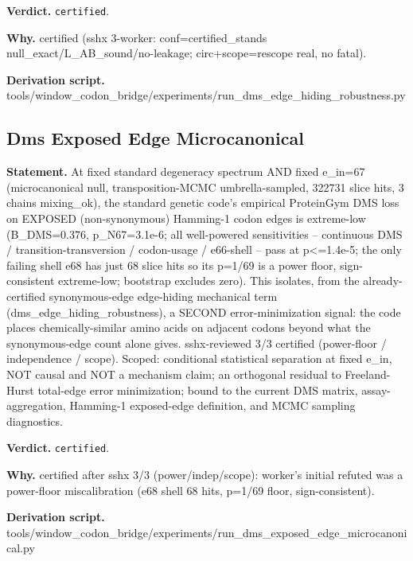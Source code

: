 \textbf{Verdict.} \texttt{certified}.

\textbf{Why.} certified (sshx 3-worker: conf=certified\_stands null\_exact/L\_AB\_sound/no-leakage;
circ+scope=rescope real, no fatal).

\textbf{Derivation script.} tools/window\_codon\_bridge/experiments/run\_dms\_edge\_hiding\_robustness.py

\subsection{Dms Exposed Edge Microcanonical}\label{sec:bridge-dms-exposed-edge-microcanonical}
\textbf{Statement.} At fixed standard degeneracy spectrum AND fixed e\_in=67 (microcanonical null, transposition-MCMC
umbrella-sampled, 322731 slice hits, 3 chains mixing\_ok), the standard genetic code's empirical
ProteinGym DMS loss on EXPOSED (non-synonymous) Hamming-1 codon edges is extreme-low (B\_DMS=0.376,
p\_N67=3.1e-6; all well-powered sensitivities -- continuous DMS / transition-transversion /
codon-usage / e66-shell -- pass at p<=1.4e-5; the only failing shell e68 has just 68 slice hits so
its p=1/69 is a power floor, sign-consistent extreme-low; bootstrap excludes zero). This isolates,
from the already-certified synonymous-edge edge-hiding mechanical term
(dms\_edge\_hiding\_robustness), a SECOND error-minimization signal: the code places
chemically-similar amino acids on adjacent codons beyond what the synonymous-edge count alone gives.
sshx-reviewed 3/3 certified (power-floor / independence / scope). Scoped: conditional statistical
separation at fixed e\_in, NOT causal and NOT a mechanism claim; an orthogonal residual to
Freeland-Hurst total-edge error minimization; bound to the current DMS matrix, assay-aggregation,
Hamming-1 exposed-edge definition, and MCMC sampling diagnostics.

\textbf{Verdict.} \texttt{certified}.

\textbf{Why.} certified after sshx 3/3 (power/indep/scope): worker's initial refuted was a power-floor
miscalibration (e68 shell 68 hits, p=1/69 floor, sign-consistent).

\textbf{Derivation script.} tools/window\_codon\_bridge/experiments/run\_dms\_exposed\_edge\_microcanonical.py

